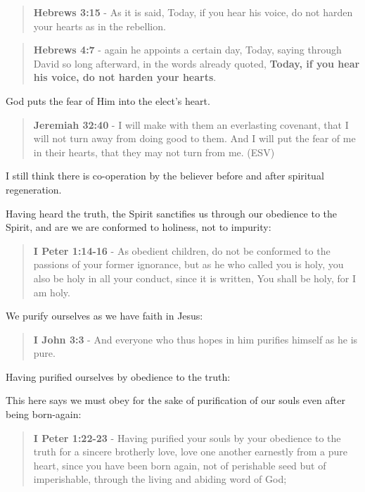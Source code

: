 \documentclass[11pt]{article}
\begin{document}
\begin{quote}
\textbf{Hebrews 3:15} - As it is said, Today, if you hear his voice, do not harden your hearts as in the rebellion.
\end{quote}

\begin{quote}
\textbf{Hebrews 4:7} - again he appoints a certain day, Today, saying through David so long afterward, in the words already quoted, \textbf{Today, if you hear his voice, do not harden your hearts}.
\end{quote}

God puts the fear of Him into the elect's heart.

\begin{quote}
\textbf{Jeremiah 32:40} - I will make with them an everlasting covenant, that I will not turn away from doing good to them. And I will put the fear of me in their hearts, that they may not turn from me. (ESV)
\end{quote}

I still think there is co-operation by the believer before and after spiritual regeneration.

Having heard the truth, the Spirit sanctifies us through our obedience to the Spirit, and are we are conformed to holiness, not to impurity:

\begin{quote}
\textbf{I Peter 1:14-16} - As obedient children, do not be conformed to the passions of your former ignorance, but as he who called you is holy, you also be holy in all your conduct, since it is written, You shall be holy, for I am holy.
\end{quote}

We purify ourselves as we have faith in Jesus:

\begin{quote}
\textbf{I John 3:3} - And everyone who thus hopes in him purifies himself as he is pure.
\end{quote}

Having purified ourselves by obedience to the truth:

This here says we must obey for the sake of purification of our souls even after being born-again:

\begin{quote}
\textbf{I Peter 1:22-23} - Having purified your souls by your obedience to the truth for a sincere brotherly love, love one another earnestly from a pure heart, since you have been born again, not of perishable seed but of imperishable, through the living and abiding word of God;
\end{quote}
\end{document}
